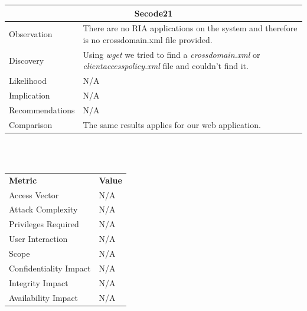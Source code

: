 \documentclass[headsepline,footsepline,footinclude=false,oneside,fontsize=11pt,paper=a4,listof=totoc,bibliography=totoc]{scrbook} %
\begin{document}
\begin{tabular}{ l|p{11cm}  }
	\hline
	\multicolumn{2}{c}{\textbf{Secode21}} \\
	\hline
	Observation   & There are no RIA applications on the system and therefore is no crossdomain.xml file provided. \\
	Discovery  & Using \textit{wget} we tried to find a \textit{crossdomain.xml} or \textit{clientaccesspolicy.xml} file and couldn't find it. \\
	Likelihood & N/A \\
	Implication    & N/A \\
	Recommendations & N/A \\
	Comparison & The same results applies for our web application. \\
	\hline
\end{tabular}
\\
\vspace{0.5cm}
\\
\begin{center}
	\begin{tabular}{ll}
		\rowcolor[HTML]{34CDF9}
		{\color[HTML]{ECF4FF} \textbf{Metric}}        & {\color[HTML]{ECF4FF} \textbf{Value}} \\
		\rowcolor[HTML]{BBDAFF}
		{\color[HTML]{333333} Access Vector}          & {\color[HTML]{333333} } N/A              \\
		\rowcolor[HTML]{ECF4FF}
		{\color[HTML]{333333} Attack Complexity}      & {\color[HTML]{333333} } N/A              \\
		\rowcolor[HTML]{BBDAFF}
		{\color[HTML]{333333} Privileges Required}    & {\color[HTML]{333333} } N/A              \\
		\rowcolor[HTML]{ECF4FF}
		{\color[HTML]{333333} User Interaction}       & {\color[HTML]{333333} } N/A              \\
		\rowcolor[HTML]{BBDAFF}
		{\color[HTML]{333333} Scope}                  & {\color[HTML]{333333} } N/A              \\
		\rowcolor[HTML]{ECF4FF}
		{\color[HTML]{333333} Confidentiality Impact} & {\color[HTML]{333333} } N/A              \\
		\rowcolor[HTML]{BBDAFF}
		{\color[HTML]{333333} Integrity Impact}       & {\color[HTML]{333333} } N/A              \\
		\rowcolor[HTML]{ECF4FF}
		{\color[HTML]{333333} Availability Impact}    & {\color[HTML]{333333} } N/A
	\end{tabular}
\end{center}
\pagebreak
\end{document}

